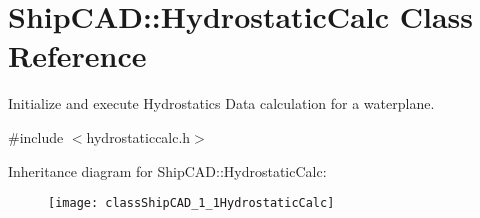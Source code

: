 \hypertarget{classShipCAD_1_1HydrostaticCalc}{}\section{Ship\+C\+AD\+:\+:Hydrostatic\+Calc Class Reference}
\label{classShipCAD_1_1HydrostaticCalc}


Initialize and execute Hydrostatics Data calculation for a waterplane.  




{\ttfamily \#include $<$hydrostaticcalc.\+h$>$}

Inheritance diagram for Ship\+C\+AD\+:\+:Hydrostatic\+Calc\+:\begin{figure}[H]
\begin{center}
\leavevmode
\texttt{[image: classShipCAD\_1\_1HydrostaticCalc]}
\end{center}
\end{figure}

